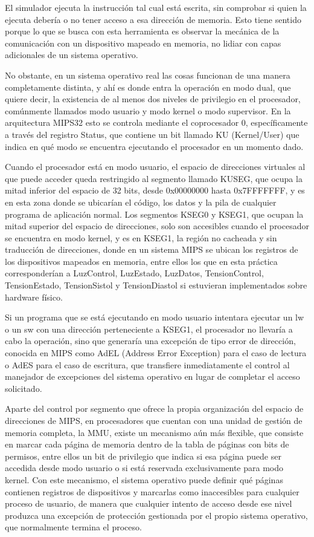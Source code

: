\documentclass[12pt, letterpaper]{article}
\begin{document}
El simulador ejecuta la instrucción tal cual está escrita, sin comprobar si quien la ejecuta debería o no tener acceso a esa dirección de memoria. Esto tiene sentido porque lo que se busca con esta herramienta es observar la mecánica de la comunicación con un dispositivo mapeado en memoria, no lidiar con capas adicionales de un sistema operativo.

No obstante, en un sistema operativo real las cosas funcionan de una manera completamente distinta, y ahí es donde entra la operación en modo dual, que quiere decir, la existencia de al menos dos niveles de privilegio en el procesador, comúnmente llamados modo usuario y modo kernel o modo supervisor. En la arquitectura MIPS32 esto se controla mediante el coprocesador 0, específicamente a través del registro Status, que contiene un bit llamado KU (Kernel/User) que indica en qué modo se encuentra ejecutando el procesador en un momento dado.

Cuando el procesador está en modo usuario, el espacio de direcciones virtuales al que puede acceder queda restringido al segmento llamado KUSEG, que ocupa la mitad inferior del espacio de 32 bits, desde 0x00000000 hasta 0x7FFFFFFF, y es en esta zona donde se ubicarían el código, los datos y la pila de cualquier programa de aplicación normal. Los segmentos KSEG0 y KSEG1, que ocupan la mitad superior del espacio de direcciones, solo son accesibles cuando el procesador se encuentra en modo kernel, y es en KSEG1, la región no cacheada y sin traducción de direcciones, donde en un sistema MIPS se ubican los registros de los dispositivos mapeados en memoria, entre ellos los que en esta práctica corresponderían a LuzControl, LuzEstado, LuzDatos, TensionControl, TensionEstado, TensionSistol y TensionDiastol si estuvieran implementados sobre hardware físico.

Si un programa que se está ejecutando en modo usuario intentara ejecutar un lw o un sw con una dirección perteneciente a KSEG1, el procesador no llevaría a cabo la operación, sino que generaría una excepción de tipo error de dirección, conocida en MIPS como AdEL (Address Error Exception) para el caso de lectura o AdES para el caso de escritura, que transfiere inmediatamente el control al manejador de excepciones del sistema operativo en lugar de completar el acceso solicitado.

Aparte del control por segmento que ofrece la propia organización del espacio de direcciones de MIPS, en procesadores que cuentan con una unidad de gestión de memoria completa, la MMU, existe un mecanismo aún más flexible, que consiste en marcar cada página de memoria dentro de la tabla de páginas con bits de permisos, entre ellos un bit de privilegio que indica si esa página puede ser accedida desde modo usuario o si está reservada exclusivamente para modo kernel. Con este mecanismo, el sistema operativo puede definir qué páginas contienen registros de dispositivos y marcarlas como inaccesibles para cualquier proceso de usuario, de manera que cualquier intento de acceso desde ese nivel produzca una excepción de protección gestionada por el propio sistema operativo, que normalmente termina el proceso.
\end{document}
